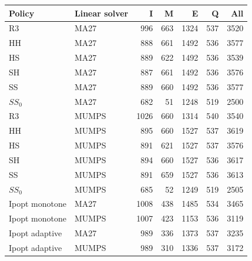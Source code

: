 \begin{tabular}{@{}llrrrrr@{}}
\toprule
Policy & Linear solver & I & M & E & Q & All\\
\midrule
R3 & MA27 & 996 & 663 & 1324 & 537 & 3520\\
HH & MA27 & 888 & 661 & 1492 & 536 & 3577\\
HS & MA27 & 889 & 622 & 1492 & 536 & 3539\\
SH & MA27 & 887 & 661 & 1492 & 536 & 3576\\
SS & MA27 & 889 & 660 & 1492 & 536 & 3577\\
$SS_0$ & MA27 & 682 & 51 & 1248 & 519 & 2500\\
R3 & MUMPS & 1026 & 660 & 1314 & 540 & 3540\\
HH & MUMPS & 895 & 660 & 1527 & 537 & 3619\\
HS & MUMPS & 891 & 621 & 1527 & 537 & 3576\\
SH & MUMPS & 894 & 660 & 1527 & 536 & 3617\\
SS & MUMPS & 891 & 659 & 1527 & 536 & 3613\\
$SS_0$ & MUMPS & 685 & 52 & 1249 & 519 & 2505\\
Ipopt monotone & MA27 & 1008 & 438 & 1485 & 534 & 3465\\
Ipopt monotone & MUMPS & 1007 & 423 & 1153 & 536 & 3119\\
Ipopt adaptive & MA27 & 989 & 336 & 1373 & 537 & 3235\\
Ipopt adaptive & MUMPS & 989 & 310 & 1336 & 537 & 3172\\
\bottomrule
\end{tabular}

